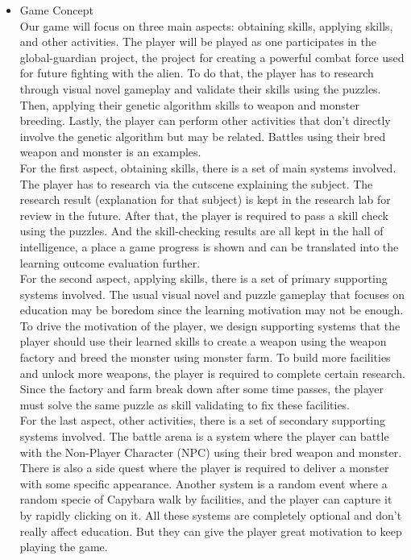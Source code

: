 \documentclass[12pt,oneside,openright,a4paper]{cpe-english-project}
\begin{document}
\begin{itemize}

\item Game Concept \\
Our game will focus on three main aspects: obtaining skills, applying skills, and other activities. The player will be played as one participates in the global-guardian project, the project for creating a powerful combat force used for future fighting with the alien. To do that, the player has to research through visual novel gameplay and validate their skills using the puzzles. Then, applying their genetic algorithm skills to weapon and monster breeding. Lastly, the player can perform other activities that don't directly involve the genetic algorithm but may be related. Battles using their bred weapon and monster is an examples. \\
For the first aspect, obtaining skills, there is a set of main systems involved. The player has to research via the cutscene explaining the subject. The research result (explanation for that subject) is kept in the research lab for review in the future. After that, the player is required to pass a skill check using the puzzles. And the skill-checking results are all kept in the hall of intelligence, a place a game progress is shown and can be translated into the learning outcome evaluation further. \\
For the second aspect, applying skills, there is a set of primary supporting systems involved. The usual visual novel and puzzle gameplay that focuses on education may be boredom since the learning motivation may not be enough. To drive the motivation of the player, we design supporting systems that the player should use their learned skills to create a weapon using the weapon factory and breed the monster using monster farm. To build more facilities and unlock more weapons, the player is required to complete certain research. Since the factory and farm break down after some time passes, the player must solve the same puzzle as skill validating to fix these facilities. \\
For the last aspect, other activities, there is a set of secondary supporting systems involved. The battle arena is a system where the player can battle with the Non-Player Character (NPC) using their bred weapon and monster. There is also a side quest where the player is required to deliver a monster with some specific appearance. Another system is a random event where a random specie of Capybara walk by facilities, and the player can capture it by rapidly clicking on it. All these systems are completely optional and don't really affect education. But they can give the player great motivation to keep playing the game.



\end{itemize}
\end{document}
